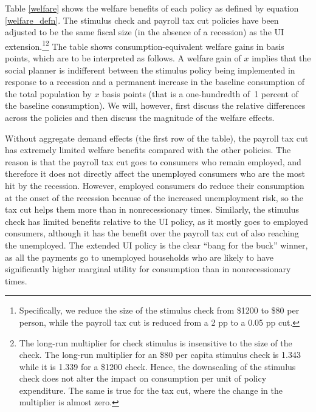 \documentclass[\econtexRoot/EGMN]{subfiles}
\begin{document}
Table \ref{welfare} shows the welfare benefits of each policy as defined by equation \eqref{welfare_defn}. The stimulus check and payroll tax cut policies have been adjusted to be the same fiscal size (in the absence of a recession) as the UI extension.\footnote{Specifically, we reduce the size of the stimulus check from \$1200 to \$80 per person, while the payroll tax cut is reduced from a 2 pp to a 0.05 pp cut.}\footnote{The long-run multiplier for check stimulus is insensitive to the size of the check. The long-run multiplier for an \$80 per capita stimulus check is 1.343 while it is 1.339 for a \$1200 check. Hence, the downscaling of the stimulus check does not alter the impact on consumption per unit of policy expenditure. The same is true for the tax cut, where the change in the multiplier is almost zero.} The table shows consumption-equivalent welfare gains in basis points, which are to be interpreted as follows. A welfare gain of $x$ implies that the social planner is indifferent between the stimulus policy being implemented in response to a recession and a permanent increase in the baseline consumption of the total population by $x$ basis points (that is a one-hundredth of~1 percent of the baseline consumption). We will, however, first discuss the relative differences across the policies and then discuss the magnitude of the welfare effects.

Without aggregate demand effects (the first row of the table), the payroll tax cut has extremely limited welfare benefits compared with the other policies. The reason is that the payroll tax cut goes to consumers who remain employed, and therefore it does not directly affect the unemployed consumers who are the most hit by the recession. However, employed consumers do reduce their consumption at the onset of the recession because of the increased unemployment risk, so the tax cut helps them more than in nonrecessionary times. Similarly, the stimulus check has limited benefits relative to the UI policy, as it mostly goes to employed consumers, although it has the benefit over the payroll tax cut of also reaching the unemployed. The extended UI policy is the clear ``bang for the buck'' winner, as all the payments go to unemployed households who are likely to have significantly higher marginal utility for consumption than in nonrecessionary times.
\end{document}
